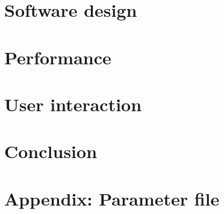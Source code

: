 \documentclass[%
 aip,
superscriptaddress,
 amsmath,amssymb,
preprint,%
]{revtex4-2}
\begin{document}
\section{Software design}


\section{Performance}



\section{User interaction}


\section{Conclusion}


\section{Appendix: Parameter file}




\end{document}
